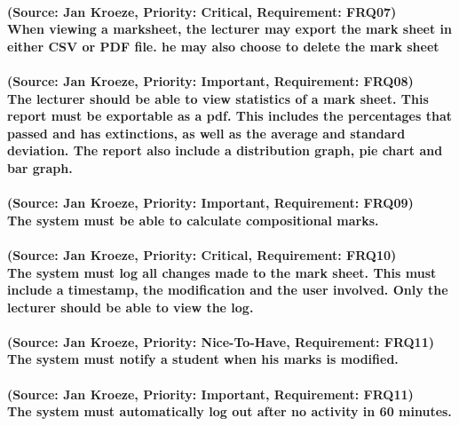 \documentclass[12pt]{article}
\begin{document}
  \paragraph{(Source: Jan Kroeze, Priority: Critical, Requirement: FRQ07) \\
  When viewing a marksheet, the lecturer may export the mark sheet in either CSV or PDF file. he may also choose to delete the mark sheet}
  \paragraph{(Source: Jan Kroeze, Priority: Important, Requirement: FRQ08) \\
  The lecturer should be able to view statistics of a mark sheet.  This report must be exportable as a pdf. This includes the percentages that passed and has extinctions, as well as the average and standard deviation. The report also include a distribution graph, pie chart and bar graph.}
  \paragraph{(Source: Jan Kroeze, Priority: Important, Requirement: FRQ09) \\
  The system must be able to calculate compositional marks.}
  \paragraph{(Source: Jan Kroeze, Priority: Critical, Requirement: FRQ10) \\
  The system must log all changes made to the mark sheet. This must include a timestamp, the modification and the user involved. Only the lecturer should be able to view the log.}
  \paragraph{(Source: Jan Kroeze, Priority: Nice-To-Have, Requirement: FRQ11) \\
  The system must notify a student when his marks is modified.}
  \paragraph{(Source: Jan Kroeze, Priority: Important, Requirement: FRQ11) \\
  The system must automatically log out after no activity in 60 minutes.}
\end{document}

